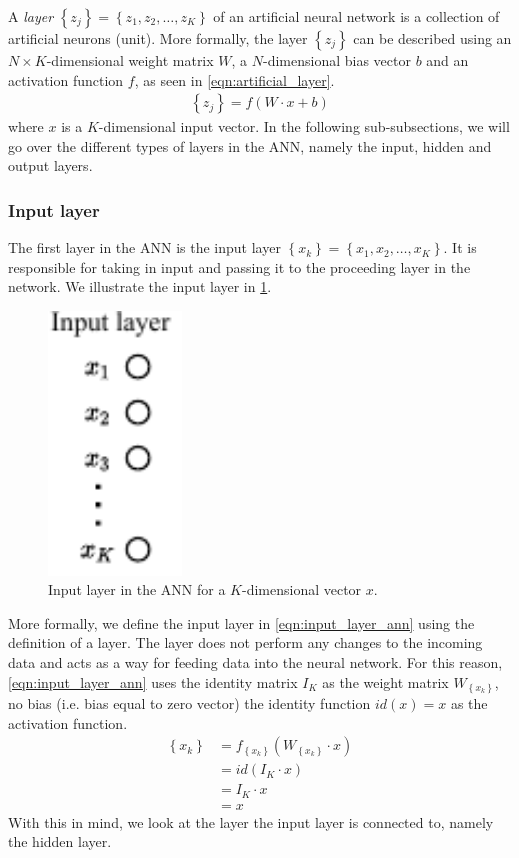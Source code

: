 \newcommand{\layer}[2]{\left\{ {#1}_{#2} \right\}}

A \textit{layer} $\layer{z}{j} = \left\{ z_1, z_2, \ldots, z_K \right\}$ of an artificial neural network is a collection of artificial neurons (unit). More formally, the layer $\layer{z}{j}$ can be described using an $N \times K$-dimensional weight matrix $W$, a $N$-dimensional bias vector $b$ and an activation function $f$, as seen in \cref{eqn:artificial_layer}.
\begin{align}
    \layer{z}{j} = f \left( W \cdot x + b \right)
    \label{eqn:artificial_layer}
\end{align}
where $x$ is a $K$-dimensional input vector. In the following sub-subsections, we will go over the different types of layers in the ANN, namely the input, hidden and output layers.

\subsubsection{Input layer}
\label{sec:ann-input-layer}
The first layer in the ANN is the input layer $\layer{x}{k} = \left\{ x_1, x_2, \ldots, x_K \right\}$. It is responsible for taking in input and passing it to the proceeding layer in the network. We illustrate the input layer in \cref{fig:input_layer_ann}.

\begin{figure}[H]
    \centering
    \includegraphics[height=7cm]{thesis/figures/artificial-neural-network-input-layer_cropped.pdf}
    \caption{Input layer in the ANN for a $K$-dimensional vector $x$.}
    \label{fig:input_layer_ann}
\end{figure}

More formally, we define the input layer in \cref{eqn:input_layer_ann} using the definition of a layer. The layer does not perform any changes to the incoming data and acts as a way for feeding data into the neural network. For this reason, \cref{eqn:input_layer_ann} uses the identity matrix $I_K$ as the weight matrix $W_{\layer{x}{k}}$, no bias (i.e. bias equal to zero vector) the identity function $id(x)=x$ as the activation function.
\begin{align}
    \label{eqn:input_layer_ann}
    \layer{x}{k}
    &= f_{\layer{x}{k}}(W_{\layer{x}{k}} \cdot x) \\
    &= id(I_K \cdot x) \\
    &= I_K \cdot x \\
    &= x
\end{align}
With this in mind, we look at the layer the input layer is connected to, namely the hidden layer.

